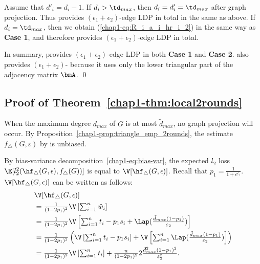 Assume that $d'_i = d_i - 1$. 
If $d_i > \td_{max}$, then $d_i = d'_i = \td_{max}$ after graph projection. 
Thus  provides $(\epsilon_1 + \epsilon_2)$-edge LDP in total in the same as above. 
If $d_i = \td_{max}$, then we obtain (\ref{chap1-eq:R_i_a_i_hr_i_2}) in the same way as \textbf{Case 1}, and therefore  provides $(\epsilon_1 + \epsilon_2)$-edge LDP in total.

\smallskip
In summary,  provides $(\epsilon_1 + \epsilon_2)$-edge LDP in both \textbf{Case 1} and \textbf{Case 2}. 
 also provides $(\epsilon_1 + \epsilon_2)$- 
because it uses only the lower triangular part of the adjacency matrix $\bmA$. \qed

\subsection{Proof of Theorem~\ref{chap1-thm:local2rounds}}
  When the maximum degree $d_{max}$ of $G$ is at most $\tilde{d}_{max}$, no graph
  projection will occur.
  By Proposition~\ref{chap1-prop:triangle_emp_2rounds}, the estimate
  $f_\triangle(G,\varepsilon)$ by  is unbiased.

  By bias-variance
  decomposition~\eqref{chap1-eq:bias-var}, the expected $l_2$ loss
  $\E[l_2^2(\hf_\triangle(G, \epsilon), f_\triangle(G))]$ is equal to
  $\V[\hf_\triangle(G,\epsilon)]$.
  Recall that $p_1 = \frac{1}{1+e^{\epsilon_1}}$.
  $\V[\hf_\triangle(G,\epsilon)]$ 
  can be written as follows:
  \begin{align}
    &\V[\hf_\triangle(G,\epsilon)] \\
    &= \textstyle{\frac{1}{(1-2p_1)^2}\V\left[\sum_{i=1}^n
    \hat{w}_i\right]} \nonumber \\
    &= \textstyle{\frac{1}{(1-2p_1)^2}\V\left[\sum_{i=1}^n
    t_i - p_1 s_i +
    \Lap(\frac{\tilde{d}_{max}(1-p_1)}{\varepsilon_2})\right]} \nonumber \\
    &= \textstyle{\frac{1}{(1-2p_1)^2}\left(\V\left[\sum_{i=1}^n
    t_i - p_1 s_i \right] +
    \V\left[\sum_{i=1}^n
    \Lap(\frac{\tilde{d}_{max}(1-p_1)}{\varepsilon_2})\right]\right)} \nonumber \\
    &= \textstyle{\frac{1}{(1-2p_1)^2}\V\left[\sum_{i=1}^n
    t_i \right] + \frac{n}{(1-2p_1)^2}
    2\frac{\tilde{d}_{max}^2(1-p_1)^2}{\varepsilon_2^2}}.\label{chap1-eq:local2rounds-var}
  \end{align}

